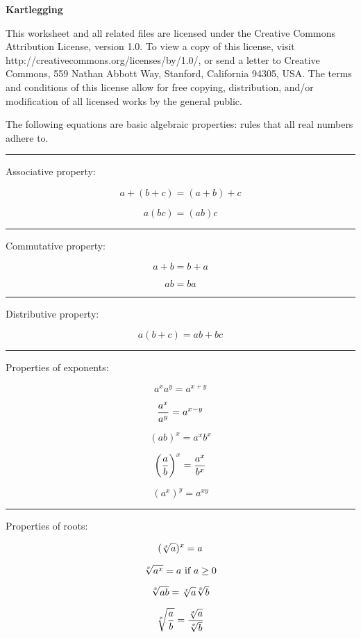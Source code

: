 
\centerline{\bf Kartlegging} \bigskip 
 
\vskip 5pt
 
This worksheet and all related files are licensed under the Creative Commons Attribution License, version 1.0.  To view a copy of this license, visit http://creativecommons.org/licenses/by/1.0/, or send a letter to Creative Commons, 559 Nathan Abbott Way, Stanford, California 94305, USA.  The terms and conditions of this license allow for free copying, distribution, and/or modification of all licensed works by the general public.

\bigskip 


\vfill \eject 

The following equations are basic algebraic properties: rules that all real numbers adhere to.

\vskip 10pt

\hrule

\vskip 3pt

Associative property:

$$a + (b + c) = (a + b) + c$$

$$a(bc) = (ab)c$$

\vskip 3pt

\hrule

\vskip 3pt

Commutative property:

$$a + b = b + a$$

$$ab = ba $$

\vskip 3pt

\hrule

\vskip 3pt

Distributive property:

$$a(b + c) = ab + bc$$

\vskip 3pt

\hrule

\vskip 3pt

Properties of exponents:

$$a^x a^y = a^{x + y}$$

$${a^x \over a^y} = a^{x - y}$$

$$(ab)^x = a^x b^x$$

$$\biggl({a \over b}\biggr)^x = {a^x \over b^x}$$

$$(a^x)^y = a^{xy}$$

\vskip 3pt

\hrule

\vskip 3pt

Properties of roots:

$$({\root x \of a})^x = a$$

$$\root x \of {a^x} = a \hbox{ if } a \geq 0$$

$$\root x \of {ab} = \root x \of a \root x \of b$$

$$\root x \of {a \over b} = {{\root x \of a} \over {\root x \of b}}$$


